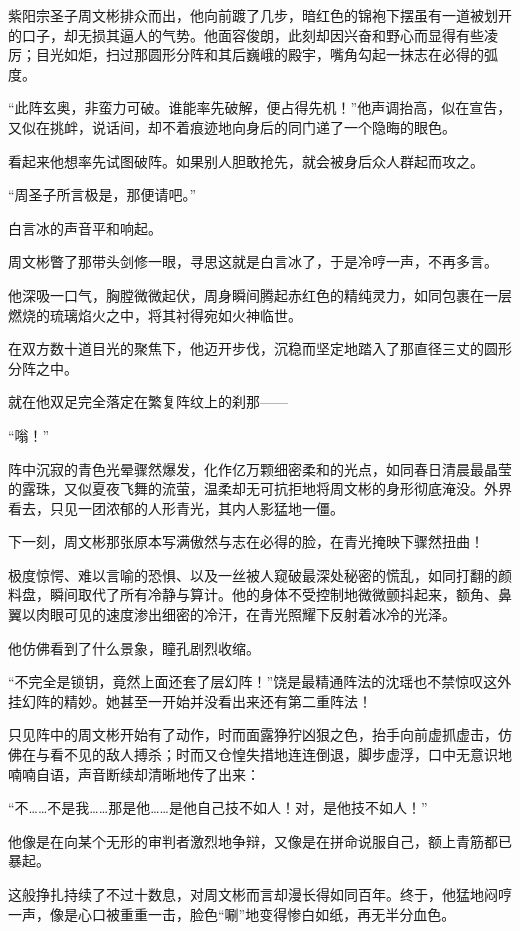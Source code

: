 紫阳宗圣子周文彬排众而出，他向前踱了几步，暗红色的锦袍下摆虽有一道被划开的口子，却无损其逼人的气势。他面容俊朗，此刻却因兴奋和野心而显得有些凌厉；目光如炬，扫过那圆形分阵和其后巍峨的殿宇，嘴角勾起一抹志在必得的弧度。

“此阵玄奥，非蛮力可破。谁能率先破解，便占得先机！”他声调抬高，似在宣告，又似在挑衅，说话间，却不着痕迹地向身后的同门递了一个隐晦的眼色。

看起来他想率先试图破阵。如果别人胆敢抢先，就会被身后众人群起而攻之。

“周圣子所言极是，那便请吧。”

白言冰的声音平和响起。

周文彬瞥了那带头剑修一眼，寻思这就是白言冰了，于是冷哼一声，不再多言。

他深吸一口气，胸膛微微起伏，周身瞬间腾起赤红色的精纯灵力，如同包裹在一层燃烧的琉璃焰火之中，将其衬得宛如火神临世。

在双方数十道目光的聚焦下，他迈开步伐，沉稳而坚定地踏入了那直径三丈的圆形分阵之中。

就在他双足完全落定在繁复阵纹上的刹那——

“嗡！”

阵中沉寂的青色光晕骤然爆发，化作亿万颗细密柔和的光点，如同春日清晨最晶莹的露珠，又似夏夜飞舞的流萤，温柔却无可抗拒地将周文彬的身形彻底淹没。外界看去，只见一团浓郁的人形青光，其内人影猛地一僵。

下一刻，周文彬那张原本写满傲然与志在必得的脸，在青光掩映下骤然扭曲！

极度惊愕、难以言喻的恐惧、以及一丝被人窥破最深处秘密的慌乱，如同打翻的颜料盘，瞬间取代了所有冷静与算计。他的身体不受控制地微微颤抖起来，额角、鼻翼以肉眼可见的速度渗出细密的冷汗，在青光照耀下反射着冰冷的光泽。

他仿佛看到了什么景象，瞳孔剧烈收缩。

“不完全是锁钥，竟然上面还套了层幻阵！”饶是最精通阵法的沈瑶也不禁惊叹这外挂幻阵的精妙。她甚至一开始并没看出来还有第二重阵法！

只见阵中的周文彬开始有了动作，时而面露狰狞凶狠之色，抬手向前虚抓虚击，仿佛在与看不见的敌人搏杀；时而又仓惶失措地连连倒退，脚步虚浮，口中无意识地喃喃自语，声音断续却清晰地传了出来：

“不……不是我……那是他……是他自己技不如人！对，是他技不如人！”

他像是在向某个无形的审判者激烈地争辩，又像是在拼命说服自己，额上青筋都已暴起。

这般挣扎持续了不过十数息，对周文彬而言却漫长得如同百年。终于，他猛地闷哼一声，像是心口被重重一击，脸色“唰”地变得惨白如纸，再无半分血色。

